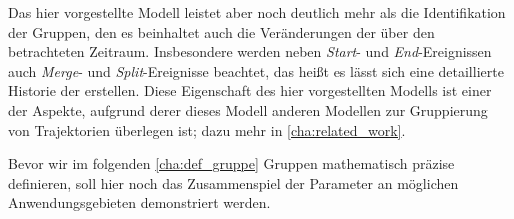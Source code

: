 Das hier vorgestellte Modell leistet aber noch deutlich mehr als die Identifikation der Gruppen, den es beinhaltet auch die Veränderungen der \GrpStruktur über den betrachteten Zeitraum.
Insbesondere werden neben \emph{Start}- und \emph{End}-Ereignissen auch \emph{Merge}- und \emph{Split}-Ereignisse beachtet, das heißt es lässt sich eine detaillierte Historie der \GrpStruktur erstellen.
Diese Eigenschaft des hier vorgestellten Modells ist einer der Aspekte, aufgrund derer dieses Modell anderen Modellen zur Gruppierung von Trajektorien überlegen ist; dazu mehr in \cref{cha:related_work}.

Bevor wir im folgenden \cref{cha:def_gruppe} Gruppen mathematisch präzise definieren, soll hier noch das Zusammenspiel der Parameter an möglichen Anwendungsgebieten demonstriert werden.
